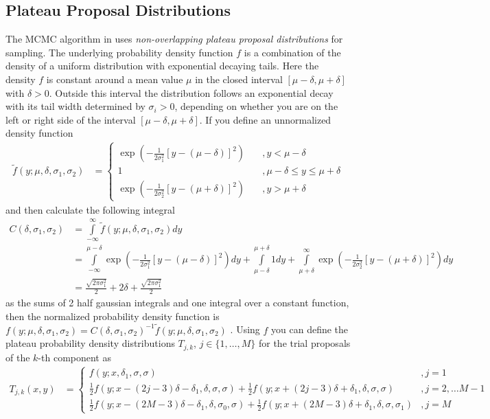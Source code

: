\documentclass{scrartcl}
\begin{document}
	\subsection{Plateau Proposal Distributions}
    The MCMC algorithm in \cite{lau2019} uses \textit{non-overlapping plateau proposal distributions} for sampling.
	The underlying probability density function $f$ is a combination of the density of a uniform distribution
	with exponential decaying tails. Here the density $f$ is constant around a mean value $\mu$ in the closed interval $[\mu-\delta,\mu+\delta]$ with $\delta > 0$.
	Outside this interval the distribution follows an exponential decay with its tail width determined by $\sigma_i > 0$,
	depending on whether you are on the left or right side of the interval $[\mu-\delta,\mu+\delta]$. If you define
	an unnormalized density function
	\begin{align*}
		\tilde{f}(y;\mu,\delta,\sigma_1,\sigma_2)&=\begin{cases}
			\exp\left( -\frac{1}{2\sigma_1^2}[y-(\mu-\delta)]^2 \right)&\quad ,y<\mu-\delta\\
           1&\quad ,\mu-\delta\leq y\leq\mu+\delta\\
           \exp\left( -\frac{1}{2\sigma_2^2}[y-(\mu+\delta)]^2 \right)&\quad ,y>\mu+\delta
		\end{cases}
	\end{align*}
    and then calculate the following integral
    \begin{align*}
        C(\delta,\sigma_1,\sigma_2)&=\int\limits_{-\infty}^\infty\tilde{f}(y;\mu,\delta,\sigma_1,\sigma_2) dy\\
        &= \int\limits_{-\infty}^{\mu-\delta}\exp\left( -\frac{1}{2\sigma_1^2}[y-(\mu-\delta)]^2 \right)dy+
        \int\limits_{\mu-\delta}^{\mu+\delta}1dy+
        \int\limits_{\mu+\delta}^{\infty}\exp\left( -\frac{1}{2\sigma_2^2}[y-(\mu+\delta)]^2 \right)dy\\
        &=\frac{\sqrt{2\pi\sigma_1^2}}{2}+2\delta+\frac{\sqrt{2\pi\sigma_1^2}}{2}
    \end{align*}
    as the sums of 2 half gaussian integrals and one integral over a constant function, then the normalized probability density function is $f(y; \mu,\delta,\sigma_1,\sigma_2)=C(\delta,\sigma_1,\sigma_2)^{-1}\tilde{f}(y;\mu,\delta,\sigma_1,\sigma_2)$ \cite{lau2019}.
    Using $f$ you can define the plateau probability density distributions $T_{j,k}$, $j\in\{1,\dots,M\}$ for the trial proposals of the $k$-th component as
    \begin{align*}
        T_{j,k}(x,y)&=\begin{cases}
                          f(y;x,\delta_1,\sigma,\sigma)&,j=1\\
                          \frac 12 f(y;x-(2j-3)\delta-\delta_1,\delta,\sigma,\sigma)+\frac 12 f(y;x+(2j-3)\delta+\delta_1,\delta,\sigma,\sigma)&,j=2,\dots M-1\\
                          \frac 12 f(y;x-(2M-3)\delta-\delta_1,\delta,\sigma_0,\sigma)+\frac 12 f(y;x+(2M-3)\delta+\delta_1,\delta,\sigma,\sigma_1)&,j=M
        \end{cases}
    \end{align*}
\end{document}
